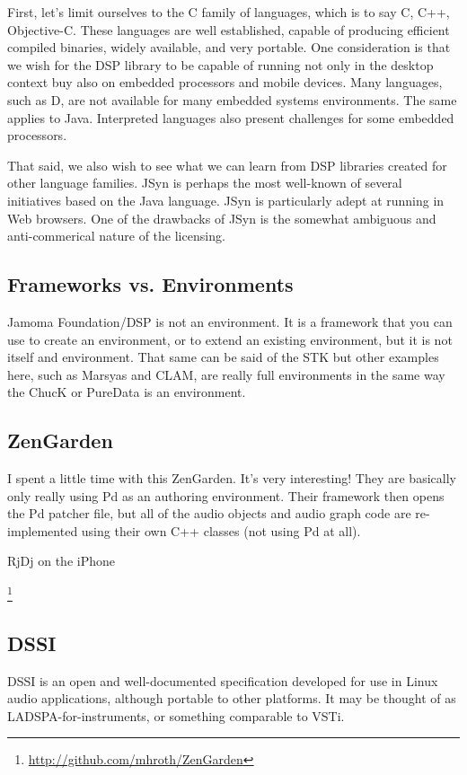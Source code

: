 \documentclass[twoside,10pt]{article}
\begin{document}
First, let's limit ourselves to the C family of languages, which is to say C, C++, Objective-C.  These languages are well established, capable of producing efficient compiled binaries, widely available, and very portable.  One consideration is that we wish for the DSP library to be capable of running not only in the desktop context buy also on embedded processors and mobile devices.  Many languages, such as D, are not available for many embedded systems environments.  The same applies to Java.  Interpreted languages also present challenges for some embedded processors.

That said, we also wish to see what we can learn from DSP libraries created for other language families.  JSyn is perhaps the most well-known of several initiatives based on the Java language\cite{Guillemard:2005, Burk:1998}.  JSyn is particularly adept at running in Web browsers.  One of the drawbacks of JSyn is the somewhat ambiguous and anti-commerical nature of the licensing.


\subsection {Frameworks vs. Environments}


Jamoma Foundation/DSP is not an environment.  It is a framework that you can use to create an environment, or to extend an existing environment, but it is not itself and environment.  That same can be said of the STK but other examples here, such as Marsyas and CLAM, are really full environments in the same way the ChucK or PureData is an environment.


\subsection{ZenGarden}

I spent a little time with this ZenGarden.  It's very interesting!
They are basically only really using Pd as an authoring environment.
Their framework then opens the Pd patcher file, but all of the audio
objects and audio graph code are re-implemented using their own C++
classes (not using Pd at all).

RjDj on the iPhone

\footnote{\url{http://github.com/mhroth/ZenGarden}}


\subsection{DSSI}
DSSI is an open and well-documented specification developed for use in Linux audio applications, although portable to other platforms. It may be thought of as LADSPA-for-instruments, or something comparable to VSTi.
\end{document}
